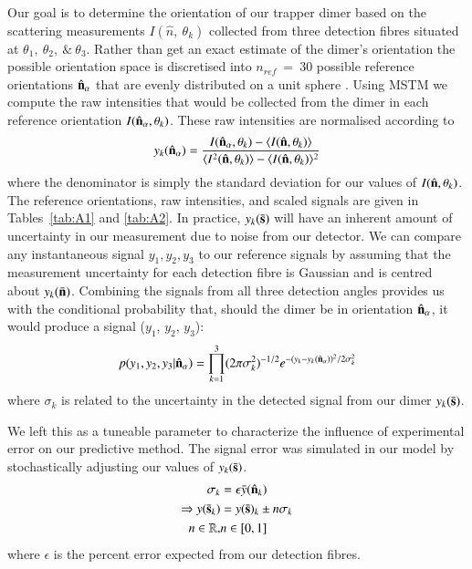 \documentclass[final, 3p]{elsarticle}
\begin{document}
Our goal is to determine the orientation of our trapper dimer based on the scattering measurements $I(\hat{n}, \ \theta_k)$ collected from three detection fibres situated at $\theta_1,\ \theta_2, \ \& \ \theta_3$. Rather than get an exact estimate of the dimer's orientation the possible orientation space is discretised into $\textit{n}_{ref} \ = \ 30$ possible reference orientations $\hat{\bf n}_{\alpha}$ that are evenly distributed on a unit sphere \cite{Rey2006}. Using MSTM we compute the raw intensities that would be collected from the dimer in each reference orientation $I(\hat{\bf n}_{\alpha}, \theta_k)$. 
%
These raw intensities are normalised according to
\begin{align}
\label{eq:scale}
  y_k(\hat{\bf n}_\alpha)
  = 
  \frac{I(\hat{\bf n}_\alpha, \theta_k) - \langle I(\hat{\bf n},\theta_k) \rangle } 
  {\langle I^2(\hat{\bf n},\theta_k) \rangle -\langle I(\hat{\bf n}, \theta_k)\rangle^2}
\end{align}
where the denominator is simply the standard deviation for our values of $I(\hat{\bf n}, \theta_k)$. The reference orientations, raw intensities, and scaled signals are given in Tables~\ref{tab:A1} and \ref{tab:A2}.
%
In practice, $y_k(\bar{\bf s})$ will have an inherent amount of uncertainty in our measurement due to noise from our detector.  We can compare any instantaneous signal $y_1, y_2, y_3$ to our reference signals by assuming that the measurement uncertainty for each detection fibre is Gaussian and is centred about $y_k(\bar{\bf n})$.
%
Combining the signals from all three detection angles provides us with the conditional probability that, should the dimer be in orientation
$\hat{\bf n}_\alpha$, it would produce a signal ($y_1$, $y_2$, $y_3$):
\begin{align}
\label{eq:conditional}
  p(y_1, y_2, y_3|\hat{\bf n}_\alpha)
  = \prod^3_{k=1}
(2\pi\sigma_k^2)^{-1/2} 
e^{-(y_{k}-y_{k}(\hat{\bf n}_\alpha))^2/2\sigma_k^2}
\end{align}
where $\sigma_k$ is related to the uncertainty in the detected signal
from our dimer $y_k(\bar{\bf s})$. 
 
We left this as a tuneable parameter to characterize the influence of experimental error on our predictive method.  The signal error was simulated in our model by stochastically adjusting our values of $y_k(\bar{\bf s})$.
\begin{eqnarray*}
  \sigma_k&=\epsilon\bar{y}(\hat{\bf n}_k)
  \\
  \Rightarrow y(\bar{\bf s}_k)&=y(\bar{\bf s})_k \pm n\sigma_k
  \\ 
n \in \mathbb{R},&n\in[0,1]
\end{eqnarray*} 
where $\epsilon$ is the percent error expected from our detection fibres.
\end{document}
